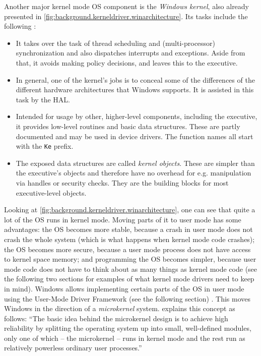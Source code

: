 Another major kernel mode OS component is the \emph{Windows kernel}, also already presented in \autoref{fig:background.kerneldriver.winarchitecture}. Its tasks include the following \cite{Yosifovich2017}:
\begin{itemize}
	\item It takes over the task of thread scheduling and (multi-processor) synchronization and also dispatches interrupts and exceptions. Aside from that, it avoids making policy decisions, and leaves this to the executive.
	\item In general, one of the kernel's jobs is to conceal some of the differences of the different hardware architectures that Windows supports. It is assisted in this task by the HAL.
	\item Intended for usage by other, higher-level components, including the executive, it provides low-level routines and basic data structures. These are partly documented and may be used in device drivers. The function names all start with the \texttt{Ke} prefix.
	\item The exposed data structures are called \emph{kernel objects}. These are simpler than the executive's objects and therefore have no overhead for e.g. manipulation via handles or security checks. They are the building blocks for most executive-level objects.
\end{itemize}

Looking at \autoref{fig:background.kerneldriver.winarchitecture}, one can see that quite a lot of the OS runs in kernel mode. Moving parts of it to user mode has some advantages: the OS becomes more stable, because a crash in user mode does not crash the whole system (which is what happens when kernel mode code crashes); the OS becomes more secure, because a user mode process does not have access to kernel space memory; and programming the OS becomes simpler, because user mode code does not have to think about as many things as kernel mode code (see the following two sections for examples of what kernel mode drivers need to keep in mind). Windows allows implementing certain parts of the OS in user mode using the User-Mode Driver Framework (see the following section) \cite{Wdf}. This moves Windows in the direction of a \emph{microkernel} system. \cite{Tanenbaum2015} explains this concept as follows: ``The basic idea behind the microkernel design is to achieve high reliability by splitting the operating system up into small, well-defined modules, only one of which -- the microkernel -- runs in kernel mode and the rest run as relatively powerless ordinary user processes.''

